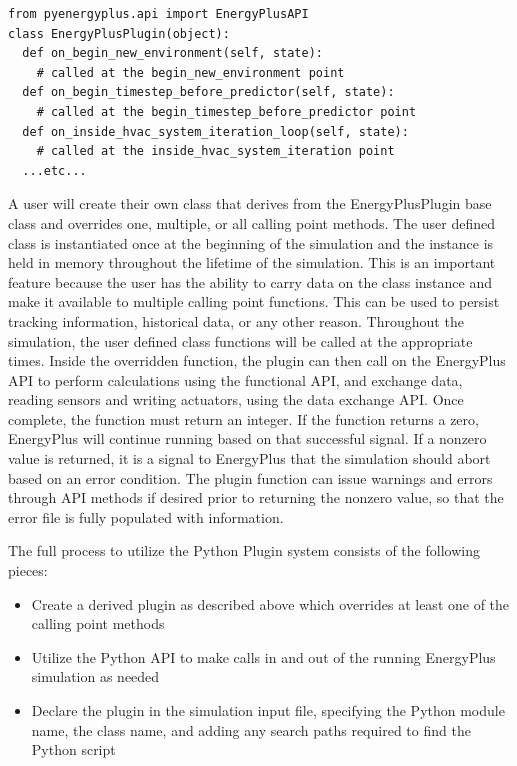 \documentclass[5p]{elsarticle}
\begin{document}
\lstset{language=python}
\begin{lstlisting}
from pyenergyplus.api import EnergyPlusAPI
class EnergyPlusPlugin(object):
  def on_begin_new_environment(self, state):
    # called at the begin_new_environment point
  def on_begin_timestep_before_predictor(self, state):
    # called at the begin_timestep_before_predictor point
  def on_inside_hvac_system_iteration_loop(self, state):
    # called at the inside_hvac_system_iteration point
  ...etc...
\end{lstlisting}

A user will create their own class that derives from the EnergyPlusPlugin base class and overrides one, multiple, or all calling point methods.  The user defined class is instantiated once at the beginning of the simulation and the instance is held in memory throughout the lifetime of the simulation.  This is an important feature because the user has the ability to carry data on the class instance and make it available to multiple calling point functions.  This can be used to persist tracking information, historical data, or any other reason.  Throughout the simulation, the user defined class functions will be called at the appropriate times.  Inside the overridden function, the plugin can then call on the EnergyPlus API to perform calculations using the functional API, and exchange data, reading sensors and writing actuators, using the data exchange API.  Once complete, the function must return an integer.  If the function returns a zero, EnergyPlus will continue running based on that successful signal.  If a nonzero value is returned, it is a signal to EnergyPlus that the simulation should abort based on an error condition.  The plugin function can issue warnings and errors through API methods if desired prior to returning the nonzero value, so that the error file is fully populated with information.

The full process to utilize the Python Plugin system consists of the following pieces:
\begin{itemize}
 \item Create a derived plugin as described above which overrides at least one of the calling point methods
 \item Utilize the Python API to make calls in and out of the running EnergyPlus simulation as needed
 \item Declare the plugin in the simulation input file, specifying the Python module name, the class name, and adding any search paths required to find the Python script
\end{itemize}
\end{document}

